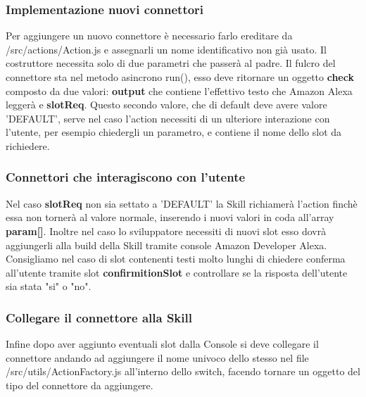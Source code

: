 \subsubsection{Implementazione nuovi connettori}
Per aggiungere un nuovo connettore è necessario farlo ereditare da /src/actions/Action.js e assegnarli un nome identificativo non già usato. Il costruttore necessita solo di due parametri che passerà al padre. Il fulcro del connettore sta nel metodo asincrono run(), esso deve ritornare un oggetto \textbf{check} composto da due valori: \textbf{output} che contiene l'effettivo testo che Amazon Alexa leggerà e \textbf{slotReq}. Questo secondo valore, che di default deve avere valore 'DEFAULT', serve nel caso l'action necessiti di un ulteriore interazione con l'utente, per esempio chiedergli un parametro, e contiene il nome dello slot da richiedere.

\subsubsection{Connettori che interagiscono con l'utente}
Nel caso \textbf{slotReq} non sia settato a 'DEFAULT' la Skill richiamerà l'action finchè essa non tornerà al valore normale, inserendo i nuovi valori in coda all'array \textbf{param[]}. Inoltre nel caso lo sviluppatore necessiti di nuovi slot esso dovrà aggiungerli alla build della Skill tramite console Amazon Developer Alexa.\\
Consigliamo nel caso di slot contenenti testi molto lunghi di chiedere conferma all'utente tramite slot \textbf{confirmitionSlot} e controllare se la risposta dell'utente sia stata "si" o "no".

\subsubsection{Collegare il connettore alla Skill}
Infine dopo aver aggiunto eventuali slot dalla Console si deve collegare il connettore andando ad aggiungere il nome univoco dello stesso nel file /src/utils/ActionFactory.js all'interno dello switch, facendo tornare un oggetto del tipo del connettore da aggiungere.